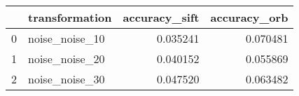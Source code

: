 \begin{tabular}{llrr}
\toprule
 & transformation & accuracy_sift & accuracy_orb \\
\midrule
0 & noise_noise_10 & 0.035241 & 0.070481 \\
1 & noise_noise_20 & 0.040152 & 0.055869 \\
2 & noise_noise_30 & 0.047520 & 0.063482 \\
\bottomrule
\end{tabular}

